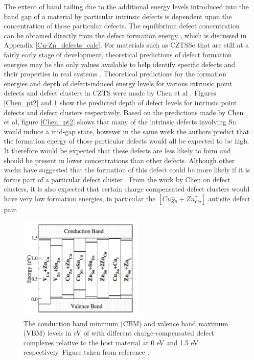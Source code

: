 The extent of band tailing due to the additional energy levels introduced into the band gap of a material by particular intrinsic defects is dependent upon the concentration of those particular defects. The equilibrium defect concentration can be obtained directly from the defect formation energy \cite{DFT_in_mat}, which is discussed in Appendix \ref{Cu-Zn_defects_calc}. For materials such as CZTSSe that are still at a fairly early stage of development, theoretical predictions of defect formation energies may be the only values available to help identify specific defects and their properties in real systems \cite{kosyak}. Theoretical predictions for the formation energies and depth of defect-induced energy levels for various intrinsic point defects and defect clusters in CZTS were made by Chen et al \cite{defect1}. Figures \ref{Chen_pt2} and \ref{Chen_cluster2} show the predicted depth of defect levels for intrinsic point defects and defect clusters respectively. Based on the predictions made by Chen et al, figure \ref{Chen_pt2} shows that many of the intrinsic defects involving Sn would induce a mid-gap state, however in the same work the authors predict that the formation energy of those particular defects would all be expected to be high. It therefore would be expected that these defects are less likely to form and should be present in lower concentrations than other defects. Although other works have suggested that the formation of this defect could be more likely if it is forms part of a particular defect cluster \cite{CZTS_n-type, culprit}. From the work by Chen on defect clusters, it is also expected that certain charge compensated defect clusters would have very low formation energies, in particular the $[Cu_{Zn}^{-} + Zn_{Cu}^{+}]$ antisite defect pair.


\begin{figure}[h!]
  \centering
    \includegraphics[width=0.55\textwidth]{figures/Chen_cluster_E-level.png}
    \caption{The conduction band minimum (CBM) and valence band maximum (VBM) levels in eV of \CZTS with different charge-compensated defect complexes relative to the host material at 0 eV and 1.5 eV respectively. Figure taken from reference . }
  \label{Chen_cluster2}
\end{figure}

